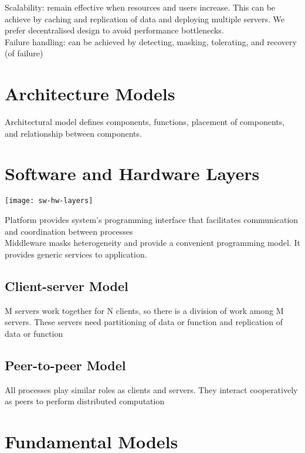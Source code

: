 \begin{multicols*}{2}
\noindent Scalability: remain effective when resources and users increase. This can be achieve by caching and replication of data and deploying multiple servers. We prefer decentralised design to avoid performance bottlenecks. \\

\noindent Failure handling: can be achieved by detecting, masking, tolerating, and recovery (of failure)

\section{Architecture Models}

\noindent Architectural model defines components, functions, placement of components, and relationship between components.

\section{Software and Hardware Layers}

\begin{center}
\texttt{[image: sw-hw-layers]}
\end{center}

\noindent Platform provides system’s programming interface that facilitates communication and coordination between processes\\ 

\noindent Middleware masks heterogeneity and provide a convenient programming model. It provides generic services to application.

\subsection{Client-server Model}

\noindent M servers work together for N clients, so there is a division of work among M servers. These servers need partitioning of data or function and replication of data or function

\subsection{Peer-to-peer Model}

\noindent All processes play similar roles as clients and servers. They interact cooperatively as peers to perform distributed computation 

\section{Fundamental Models}


\end{multicols*}
